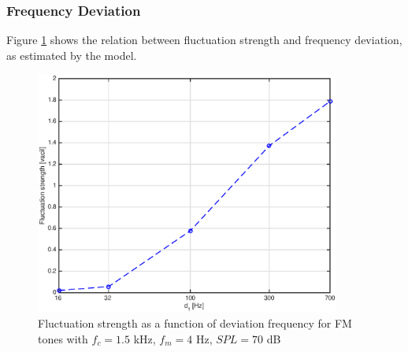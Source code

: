 \documentclass[a4paper]{article}
\begin{document}
\subsubsection{Frequency Deviation}

Figure \ref{fig:FMtonesdfplot} shows the relation between fluctuation strength
and frequency deviation, as estimated by the model.

\begin{figure}[ht]
    \centering
    \includegraphics[height=8cm]{img/fm_tones_df_plot}
    \caption{Fluctuation strength as a function of deviation frequency for FM
        tones with $f_c = 1.5$ kHz, $f_m = 4$ Hz, $SPL = 70$ dB}
    \label{fig:FMtonesdfplot}
\end{figure}
\end{document}

